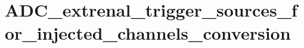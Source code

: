\hypertarget{group___a_d_c__extrenal__trigger__sources__for__injected__channels__conversion}{\section{A\-D\-C\-\_\-extrenal\-\_\-trigger\-\_\-sources\-\_\-for\-\_\-injected\-\_\-channels\-\_\-conversion}
\label{group___a_d_c__extrenal__trigger__sources__for__injected__channels__conversion}
}
